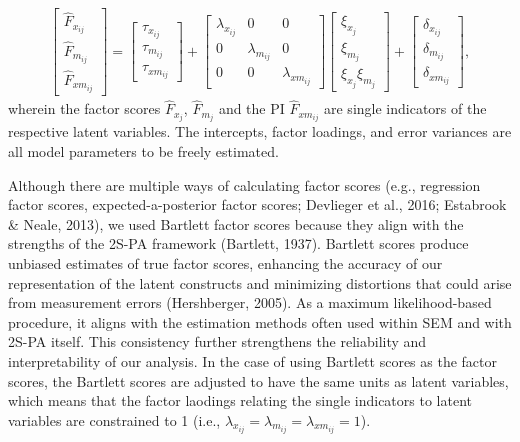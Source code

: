 \documentclass[
  man]{apa7}
\begin{document}
\begin{align}
    \begin{bmatrix}
        \widehat{F}_{x_{ij}} \\ 
        \widehat{F}_{m_{ij}} \\
        \widehat{F}_{xm_{ij}}
    \end{bmatrix} = 
    \begin{bmatrix}
        \tau_{x_{ij}} \\
        \tau_{m_{ij}} \\ 
        \tau_{xm_{ij}} 
    \end{bmatrix} + 
    \begin{bmatrix}
        \lambda_{x_{ij}} & 0 & 0 \\
        0 & \lambda_{m_{ij}} & 0 \\ 
        0 & 0 & \lambda_{xm_{ij}} 
    \end{bmatrix} 
    \begin{bmatrix}
        \xi_{x_{j}} \\
        \xi_{m_{j}} \\
        \xi_{x_{j}}\xi_{m_{j}}
    \end{bmatrix} +
    \begin{bmatrix}
        \delta_{x_{ij}} \\
        \delta_{m_{ij}} \\ 
        \delta_{xm_{ij}}
    \end{bmatrix},
\end{align}
wherein the factor scores \(\hat{F}_{x_{j}}\), \(\hat{F}_{m_{j}}\) and the PI \(\hat{F}_{xm_{ij}}\) are single indicators of the respective latent variables. The intercepts, factor loadings, and error variances are all model parameters to be freely estimated.

Although there are multiple ways of calculating factor scores (e.g., regression factor scores, expected-a-posterior factor scores; Devlieger et al., 2016; Estabrook \& Neale, 2013), we used Bartlett factor scores because they align with the strengths of the 2S-PA framework (Bartlett, 1937). Bartlett scores produce unbiased estimates of true factor scores, enhancing the accuracy of our representation of the latent constructs and minimizing distortions that could arise from measurement errors (Hershberger, 2005). As a maximum likelihood-based procedure, it aligns with the estimation methods often used within SEM and with 2S-PA itself. This consistency further strengthens the reliability and interpretability of our analysis. In the case of using Bartlett scores as the factor scores, the Bartlett scores are adjusted to have the same units as latent variables, which means that the factor laodings relating the single indicators to latent variables are constrained to 1 (i.e., \(\lambda_{x_{ij}} = \lambda_{m_{ij}} = \lambda_{xm_{ij}} = 1\)).
\end{document}
